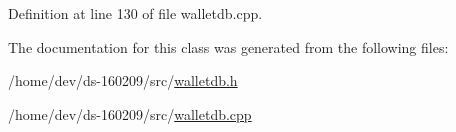 Definition at line 130 of file walletdb.\+cpp.



The documentation for this class was generated from the following files\+:\begin{DoxyCompactItemize}
\item 
/home/dev/ds-\/160209/src/\hyperlink{walletdb_8h}{walletdb.\+h}\item 
/home/dev/ds-\/160209/src/\hyperlink{walletdb_8cpp}{walletdb.\+cpp}\end{DoxyCompactItemize}
